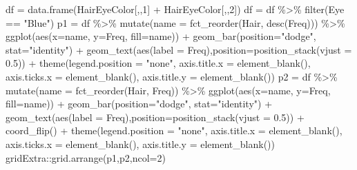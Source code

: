 \documentclass[
]{book}
\newenvironment{Shaded}{\begin{snugshade}}{\end{snugshade}}
\newcommand{\AttributeTok}[1]{\textcolor[rgb]{0.77,0.63,0.00}{#1}}
\newcommand{\DecValTok}[1]{\textcolor[rgb]{0.00,0.00,0.81}{#1}}
\newcommand{\FloatTok}[1]{\textcolor[rgb]{0.00,0.00,0.81}{#1}}
\newcommand{\FunctionTok}[1]{\textcolor[rgb]{0.00,0.00,0.00}{#1}}
\newcommand{\NormalTok}[1]{#1}
\newcommand{\OtherTok}[1]{\textcolor[rgb]{0.56,0.35,0.01}{#1}}
\newcommand{\SpecialCharTok}[1]{\textcolor[rgb]{0.00,0.00,0.00}{#1}}
\newcommand{\StringTok}[1]{\textcolor[rgb]{0.31,0.60,0.02}{#1}}
\begin{document}
\begin{Shaded}
\begin{Highlighting}[]
\NormalTok{df }\OtherTok{=} \FunctionTok{data.frame}\NormalTok{(HairEyeColor[,,}\DecValTok{1}\NormalTok{] }\SpecialCharTok{+}\NormalTok{ HairEyeColor[,,}\DecValTok{2}\NormalTok{])}
\NormalTok{df }\OtherTok{=}\NormalTok{ df }\SpecialCharTok{\%\textgreater{}\%} \FunctionTok{filter}\NormalTok{(Eye }\SpecialCharTok{==} \StringTok{"Blue"}\NormalTok{)}
\NormalTok{p1 }\OtherTok{=}\NormalTok{ df }\SpecialCharTok{\%\textgreater{}\%} \FunctionTok{mutate}\NormalTok{(}\AttributeTok{name =} \FunctionTok{fct\_reorder}\NormalTok{(Hair, }\FunctionTok{desc}\NormalTok{(Freq))) }\SpecialCharTok{\%\textgreater{}\%}
  \FunctionTok{ggplot}\NormalTok{(}\FunctionTok{aes}\NormalTok{(}\AttributeTok{x=}\NormalTok{name, }\AttributeTok{y=}\NormalTok{Freq, }\AttributeTok{fill=}\NormalTok{name)) }\SpecialCharTok{+}
  \FunctionTok{geom\_bar}\NormalTok{(}\AttributeTok{position=}\StringTok{"dodge"}\NormalTok{, }\AttributeTok{stat=}\StringTok{"identity"}\NormalTok{) }\SpecialCharTok{+}
  \FunctionTok{geom\_text}\NormalTok{(}\FunctionTok{aes}\NormalTok{(}\AttributeTok{label =}\NormalTok{ Freq),}\AttributeTok{position=}\FunctionTok{position\_stack}\NormalTok{(}\AttributeTok{vjust =} \FloatTok{0.5}\NormalTok{)) }\SpecialCharTok{+}
  \FunctionTok{theme}\NormalTok{(}\AttributeTok{legend.position =} \StringTok{"none"}\NormalTok{,}
        \AttributeTok{axis.title.x =} \FunctionTok{element\_blank}\NormalTok{(),}
        \AttributeTok{axis.ticks.x =} \FunctionTok{element\_blank}\NormalTok{(),}
        \AttributeTok{axis.title.y =} \FunctionTok{element\_blank}\NormalTok{())}
\NormalTok{p2 }\OtherTok{=}\NormalTok{ df }\SpecialCharTok{\%\textgreater{}\%} \FunctionTok{mutate}\NormalTok{(}\AttributeTok{name =} \FunctionTok{fct\_reorder}\NormalTok{(Hair, Freq)) }\SpecialCharTok{\%\textgreater{}\%}
  \FunctionTok{ggplot}\NormalTok{(}\FunctionTok{aes}\NormalTok{(}\AttributeTok{x=}\NormalTok{name, }\AttributeTok{y=}\NormalTok{Freq, }\AttributeTok{fill=}\NormalTok{name)) }\SpecialCharTok{+}
  \FunctionTok{geom\_bar}\NormalTok{(}\AttributeTok{position=}\StringTok{"dodge"}\NormalTok{, }\AttributeTok{stat=}\StringTok{"identity"}\NormalTok{) }\SpecialCharTok{+}
  \FunctionTok{geom\_text}\NormalTok{(}\FunctionTok{aes}\NormalTok{(}\AttributeTok{label =}\NormalTok{ Freq),}\AttributeTok{position=}\FunctionTok{position\_stack}\NormalTok{(}\AttributeTok{vjust =} \FloatTok{0.5}\NormalTok{)) }\SpecialCharTok{+}
  \FunctionTok{coord\_flip}\NormalTok{() }\SpecialCharTok{+}
  \FunctionTok{theme}\NormalTok{(}\AttributeTok{legend.position =} \StringTok{"none"}\NormalTok{,}
        \AttributeTok{axis.title.x =} \FunctionTok{element\_blank}\NormalTok{(),}
        \AttributeTok{axis.ticks.x =} \FunctionTok{element\_blank}\NormalTok{(),}
        \AttributeTok{axis.title.y =} \FunctionTok{element\_blank}\NormalTok{())}
\NormalTok{gridExtra}\SpecialCharTok{::}\FunctionTok{grid.arrange}\NormalTok{(p1,p2,}\AttributeTok{ncol=}\DecValTok{2}\NormalTok{)}
\end{Highlighting}
\end{Shaded}
\end{document}
